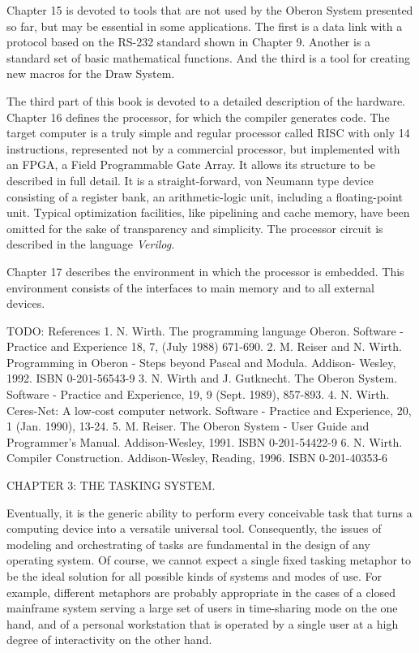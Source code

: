 Chapter 15 is devoted to tools that are not used by the Oberon System
presented so far, but may be essential in some applications. The first
is a data link with a protocol based on the RS-232 standard shown in
Chapter 9. Another is a standard set of basic mathematical
functions. And the third is a tool for creating new macros for the
Draw System.

The third part of this book is devoted to a detailed description of
the hardware. Chapter 16 defines the processor, for which the compiler
generates code. The target computer is a truly simple and regular
processor called RISC with only 14 instructions, represented not by a
commercial processor, but implemented with an FPGA, a Field
Programmable Gate Array. It allows its structure to be described in
full detail. It is a straight-forward, von Neumann type device
consisting of a register bank, an arithmetic-logic unit, including a
floating-point unit. Typical optimization facilities, like pipelining
and cache memory, have been omitted for the sake of transparency and
simplicity. The processor circuit is described in the language
{\it Verilog\/}.

Chapter 17 describes the environment in which the processor is
embedded. This environment consists of the interfaces to main memory
and to all external devices.

TODO: References
1. N. Wirth. The programming language Oberon. Software - Practice and Experience 18, 7, (July 1988) 671-690.
2. M. Reiser and N. Wirth. Programming in Oberon - Steps beyond Pascal and Modula. Addison- Wesley, 1992. ISBN 0-201-56543-9
3. N. Wirth and J. Gutknecht. The Oberon System. Software - Practice and Experience, 19, 9 (Sept. 1989), 857-893.
4. N. Wirth. Ceres-Net: A low-cost computer network. Software - Practice and Experience, 20, 1 (Jan. 1990), 13-24.
5. M. Reiser. The Oberon System - User Guide and Programmer's Manual. Addison-Wesley, 1991. ISBN 0-201-54422-9
6. N. Wirth. Compiler Construction. Addison-Wesley, Reading, 1996. ISBN 0-201-40353-6

\beginchapter CHAPTER 3: THE TASKING SYSTEM.

Eventually, it is the generic ability to perform every conceivable
task that turns a computing device into a versatile universal
tool. Consequently, the issues of modeling and orchestrating of tasks
are fundamental in the design of any operating system. Of course, we
cannot expect a single fixed tasking metaphor to be the ideal solution
for all possible kinds of systems and modes of use. For example,
different metaphors are probably appropriate in the cases of a closed
mainframe system serving a large set of users in time-sharing mode on
the one hand, and of a personal workstation that is operated by a
single user at a high degree of interactivity on the other hand.

